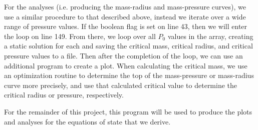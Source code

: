 For the analyses (i.e. producing the mass-radius and mass-pressure curves), we use a similar procedure to that described above, instead we iterate over a wide range of pressure values. If the boolean flag  is set on line 43, then we will enter the loop on line 149. From there, we loop over all $P_0$ values in the  array, creating a static solution for each and saving the critical mass, critical radius, and critical pressure values to a file. Then after the completion of the loop, we can use an additional program to create a plot. When calculating the critical mass, we use an optimization routine to determine the top of the mass-pressure or mass-radius curve more precisely, and use that calculated critical value to determine the critical radius or pressure, respectively. 

For the remainder of this project, this program will be used to produce the plots and analyses for the equations of state that we derive.

